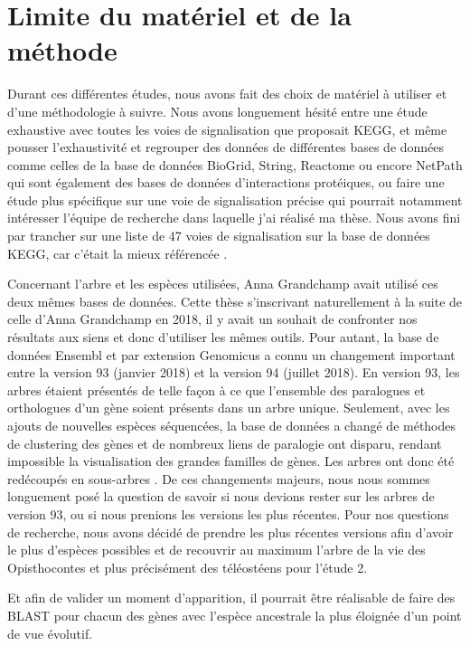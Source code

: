 \section{Limite du matériel et de la méthode}
\par Durant ces différentes études, nous avons fait des choix de matériel à utiliser et d’une méthodologie à suivre. Nous avons longuement hésité entre une étude exhaustive avec toutes les voies de signalisation que proposait KEGG, et même pousser l’exhaustivité et regrouper des données de différentes bases de données comme celles de la base de données BioGrid, String, Reactome ou encore NetPath qui sont également des bases de données d’interactions protéiques, ou faire une étude plus spécifique sur une voie de signalisation précise qui pourrait notamment intéresser l’équipe de recherche dans laquelle j’ai réalisé ma thèse. Nous avons fini par trancher sur une liste de 47 voies de signalisation sur la base de données KEGG, car c’était la mieux référencée \parencite{rigden_26th_2019}. 
\par Concernant l’arbre et les espèces utilisées, Anna Grandchamp avait utilisé ces deux mêmes bases de données. Cette thèse s’inscrivant naturellement à la suite de celle d’Anna Grandchamp en 2018, il y avait un souhait de confronter nos résultats aux siens et donc d’utiliser les mêmes outils. Pour autant, la base de données Ensembl et par extension Genomicus a connu un changement important entre la version 93 (janvier 2018) et la version 94 (juillet 2018). En version 93, les arbres étaient présentés de telle façon à ce que l’ensemble des paralogues et orthologues d’un gène soient présents dans un arbre unique. Seulement, avec les ajouts de nouvelles espèces séquencées, la base de données a changé de méthodes de clustering des gènes et de nombreux liens de paralogie ont disparu, rendant impossible la visualisation des grandes familles de gènes. Les arbres ont donc été redécoupés en sous-arbres \parencite{emily_changes_2018}. De ces changements majeurs, nous nous sommes longuement posé la question de savoir si nous devions rester sur les arbres de version 93, ou si nous prenions les versions les plus récentes. Pour nos questions de recherche, nous avons décidé de prendre les plus récentes versions afin d’avoir le plus d’espèces possibles et de recouvrir au maximum l’arbre de la vie des Opisthocontes et plus précisément des téléostéens pour l’étude 2. 
\par Et afin de valider un moment d’apparition, il pourrait être réalisable de faire des BLAST pour chacun des gènes avec l’espèce ancestrale la plus éloignée d’un point de vue évolutif. 
